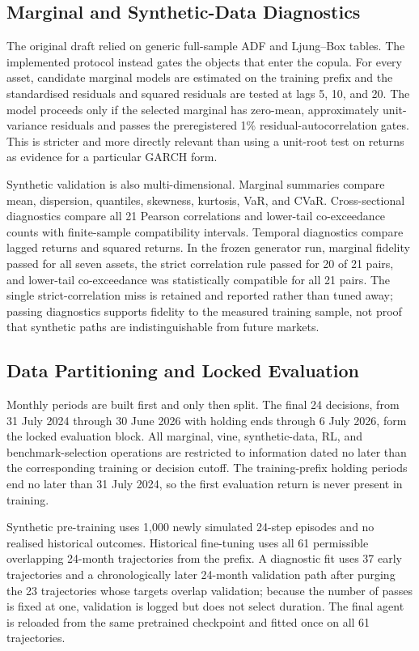 \subsection{Marginal and Synthetic-Data Diagnostics}
\label{subsec:4_stat_autocorrelation_tests}

The original draft relied on generic full-sample ADF and Ljung--Box tables. The implemented protocol instead gates the objects that enter the copula. For every asset, candidate marginal models are estimated on the training prefix and the standardised residuals and squared residuals are tested at lags 5, 10, and 20. The model proceeds only if the selected marginal has zero-mean, approximately unit-variance residuals and passes the preregistered 1\% residual-autocorrelation gates. This is stricter and more directly relevant than using a unit-root test on returns as evidence for a particular GARCH form.

Synthetic validation is also multi-dimensional. Marginal summaries compare mean, dispersion, quantiles, skewness, kurtosis, VaR, and CVaR. Cross-sectional diagnostics compare all 21 Pearson correlations and lower-tail co-exceedance counts with finite-sample compatibility intervals. Temporal diagnostics compare lagged returns and squared returns. In the frozen generator run, marginal fidelity passed for all seven assets, the strict correlation rule passed for 20 of 21 pairs, and lower-tail co-exceedance was statistically compatible for all 21 pairs. The single strict-correlation miss is retained and reported rather than tuned away; passing diagnostics supports fidelity to the measured training sample, not proof that synthetic paths are indistinguishable from future markets.

\subsection{Data Partitioning and Locked Evaluation}
\label{subsec:4_data_partitioning}

Monthly periods are built first and only then split. The final 24 decisions, from 31 July 2024 through 30 June 2026 with holding ends through 6 July 2026, form the locked evaluation block. All marginal, vine, synthetic-data, RL, and benchmark-selection operations are restricted to information dated no later than the corresponding training or decision cutoff. The training-prefix holding periods end no later than 31 July 2024, so the first evaluation return is never present in training.

Synthetic pre-training uses 1,000 newly simulated 24-step episodes and no realised historical outcomes. Historical fine-tuning uses all 61 permissible overlapping 24-month trajectories from the prefix. A diagnostic fit uses 37 early trajectories and a chronologically later 24-month validation path after purging the 23 trajectories whose targets overlap validation; because the number of passes is fixed at one, validation is logged but does not select duration. The final agent is reloaded from the same pretrained checkpoint and fitted once on all 61 trajectories.

